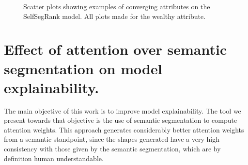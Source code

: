 \begin{figure}[ht]
	\centering
	\hspace{0mm}
	\caption[SelfSegRank score vs segmentation scatter plots]{
		Scatter plots showing examples of converging attributes on the SelfSegRank model. All plots made
		for the wealthy attribute.
	}
	\label{fig:scatters_selfsegrank}
\end{figure}

\section{Effect of attention over semantic segmentation on model explainability.} \label{sec:seg_explainability}
The main objective of this work is to improve model explainability. The tool we present
towards that objective is the use of semantic segmentation to compute attention weights. This
approach generates considerably better attention weights from a semantic standpoint, since
the shapes generated have a very high consistency with those given by the semantic segmentation,
which are by definition human understandable.

